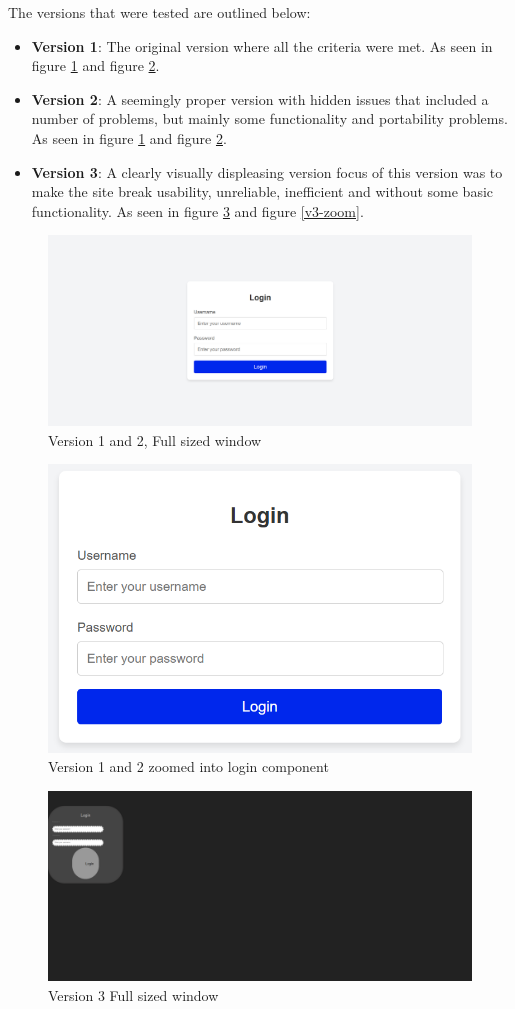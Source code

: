 \documentclass[journal,twocolumn]{IEEEtran}
\begin{document}
The versions that were tested are outlined below:
\begin{itemize}
    \item \textbf{Version 1}: The original version where all the criteria were met. As seen in figure \ref{v1-2-full} and figure \ref{v1-2-zoom}.
    \item \textbf{Version 2}: A seemingly proper version with hidden issues that included a number of problems, but mainly some functionality and portability problems. As seen in figure \ref{v1-2-full} and figure \ref{v1-2-zoom}.
    \item \textbf{Version 3}: A clearly visually displeasing version focus of this version was to make the site break usability, unreliable, inefficient and without some basic functionality. As seen in figure \ref{v3-full} and figure \ref{v3-zoom}.
\end{itemize}

\begin{figure}[H]
    \centering
    \includegraphics[width=0.6\linewidth]{login-full-size.png}
    \caption{Version 1 and 2, Full sized window}
    \label{v1-2-full}
\end{figure}

\begin{figure}[H]
    \centering
    \includegraphics[width=0.6\linewidth]{login normal.png}
    \caption{Version 1 and 2 zoomed into login component}
    \label{v1-2-zoom}
\end{figure}

\begin{figure}[H]
    \centering
    \includegraphics[width=0.6\linewidth]{V3 full size.png}
    \caption{Version 3 Full sized window}
    \label{v3-full}
\end{figure}
\end{document}
